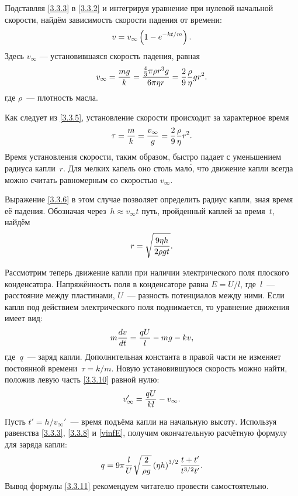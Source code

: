 Подставляя \eqref{3.3.3} в \eqref{3.3.2} и интегрируя уравнение
при нулевой начальной скорости, найдём зависимость скорости падения от времени:
\begin{equation}
	v=v_{\infty}\left(1-e^{-kt/m}\right).
	\eqmark{3.3.5}
\end{equation}
Здесь $v_{\infty}$ --- установившаяся скорость падения, равная
\begin{equation}
	v_{\infty}=\frac{mg}{k}=
    \frac{\frac 43 \pi\rho r^3g }{6\pi\eta r}= \frac29\frac{\rho}{\eta}g r^2.
	\eqmark{3.3.6}
\end{equation}
где $\rho$~--- плотность масла.

Как следует из \eqref{3.3.5}, установление скорости происходит 
за характерное время
\begin{equation}
	\tau=\frac{m}{k}= \frac{v_{\infty}}{g} = \frac 29 \frac{\rho}{\eta}r^2.
	\eqmark{3.3.7}
\end{equation}
Время установления скорости, таким образом, быстро падает с уменьшением радиуса
капли~$r$. Для мелких капель оно столь мал\'{о}, что движение капли всегда можно
считать равномерным со скоростью $v_{\infty}$. 

Выражение \eqref{3.3.6} в этом случае позволяет определить
радиус капли, зная время её падения. Обозначая через~$h\approx v_{\infty}t$ 
путь, пройденный каплей за время~$t$, найдём
\begin{equation}
	r=\sqrt{\frac{9\eta h}{2\rho g t}}.
	\eqmark{3.3.8}
\end{equation}

Рассмотрим теперь движение капли при наличии электрического поля плоского
конденсатора. Напряжённость поля в конденсаторе равна $E=U/l$,
где~$l$~--- расстояние между пластинами, $U$~--- разность потенциалов между
ними. Если капля под действием электрического поля поднимается,
то уравнение движения имеет вид:
\begin{equation}
	m\frac{dv}{dt}=\frac{qU}{l}-mg -kv,
	\eqmark{3.3.10}
\end{equation}
где~$q$~--- заряд капли. Дополнительная константа в правой части не
изменяет постоянной времени~$\tau=k/m$. 
Новую установившуюся скорость можно найти, положив левую часть 
\eqref{3.3.10} равной нулю:
\begin{equation}
\eqmark{vinfE}
v_{\infty}' = \frac{qU}{kl} - v_{\infty}.
\end{equation}

Пусть $t'=h/v_{\infty}'$~--- время подъёма капли на начальную высоту. 
Используя равенства
\eqref{3.3.3}, \eqref{3.3.8} и \eqref{vinfE}, получим 
окончательную расчётную формулу для заряда капли:
\begin{equation}
	q=9\pi\frac{l}{U}\sqrt{\frac{2}{\rho g}}
    \left(\eta h\right)^{3/2}
    \frac{t+t'}{t^{3/2}t'}.
	\eqmark{3.3.11}
\end{equation}
Вывод формулы \eqref{3.3.11} рекомендуем читателю провести самостоятельно.

